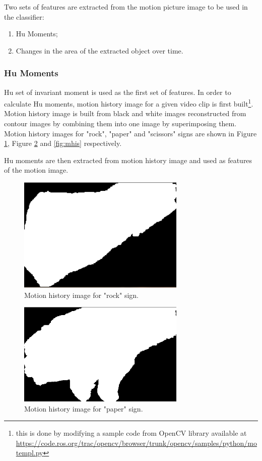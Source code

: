 Two sets of features are extracted from the motion picture image to be used in the classifier:

\begin{enumerate}
\item Hu Moments;
\item Changes in the area of the extracted object over time.
\end{enumerate}

\subsubsection*{Hu Moments}

Hu set of invariant moment is used as the first set of features. In order to calculate Hu moments, motion history image for a given video clip is first built\footnote{this is done by modifying a sample code from OpenCV library available at \url{https://code.ros.org/trac/opencv/browser/trunk/opencv/samples/python/motempl.py}}. Motion history image is built from black and white images reconstructed from contour images by combining them into one image by superimposing them. Motion history images for "rock", "paper" and "scissors" signs are shown in Figure \ref{fig:mhir}, Figure \ref{fig:mhip} and \ref{fig:mhis} respectively. 

Hu moments are then extracted from motion history image and used as features of the motion image.

\begin{figure}
\begin{center}
\includegraphics[width=80mm]{mhi_rock.png}
\caption{Motion history image for "rock" sign.}
\label{fig:mhir}
\end{center}
\end{figure}

\begin{figure}
\begin{center}
\includegraphics[width=80mm]{mhi_paper.png}
\caption{Motion history image for "paper" sign.}
\label{fig:mhip}
\end{center}
\end{figure}


